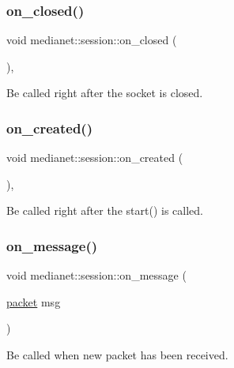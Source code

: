 \subsubsection{\texorpdfstring{on\_closed()}{on\_closed()}}
{\footnotesize\ttfamily void medianet\+::session\+::on\+\_\+closed (\begin{DoxyParamCaption}{ }\end{DoxyParamCaption})\hspace{0.3cm}{\ttfamily [protected]}, {\ttfamily [virtual]}}

Be called right after the socket is closed. \mbox{\label{classmedianet_1_1session_ae51c3ba72b54e8c894ab87d3521cb8dd}} 
\subsubsection{\texorpdfstring{on\_created()}{on\_created()}}
{\footnotesize\ttfamily void medianet\+::session\+::on\+\_\+created (\begin{DoxyParamCaption}{ }\end{DoxyParamCaption})\hspace{0.3cm}{\ttfamily [protected]}, {\ttfamily [virtual]}}

Be called right after the start() is called. \mbox{\label{classmedianet_1_1session_a89428a6c9e2420377a558c60052108d2}} 
\subsubsection{\texorpdfstring{on\_message()}{on\_message()}}
{\footnotesize\ttfamily void medianet\+::session\+::on\+\_\+message (\begin{DoxyParamCaption}\item[{\mbox{\hyperlink{classmedianet_1_1packet}{packet}}}]{msg }\end{DoxyParamCaption})\hspace{0.3cm}{\ttfamily [virtual]}}

Be called when new packet has been received. \mbox{\label{classmedianet_1_1session_a06d3f7ce4d2dca1c9948ff9ae450f25b}} 
